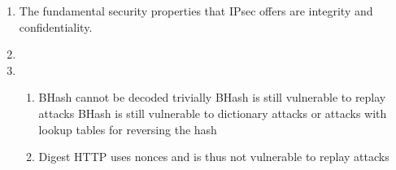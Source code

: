 \begin{enumerate}
\item %
  The fundamental security properties that IPsec offers are integrity and confidentiality.

  \item \highergradesonly
  \item %
    \begin{enumerate}
    \item
      BHash cannot be decoded trivially
      BHash is still vulnerable to replay attacks
      BHash is still vulnerable to dictionary attacks or attacks with lookup tables for reversing the hash
    \item
      Digest HTTP uses nonces and is thus not vulnerable to replay attacks
    \end{enumerate}
\end{enumerate}
